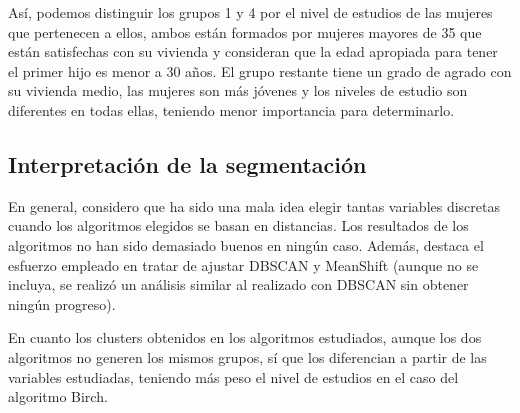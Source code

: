 \documentclass[a4paper, 20pt]{article}
\begin{document}
Así, podemos distinguir los grupos 1 y 4 por el nivel de estudios de las mujeres que pertenecen a ellos, ambos están formados por mujeres mayores de 35 que están satisfechas con su vivienda y consideran que la edad apropiada para tener el primer hijo es menor a 30 años. El grupo restante tiene un grado de agrado con su vivienda medio, las mujeres son más jóvenes y los niveles de estudio son diferentes en todas ellas, teniendo menor importancia para determinarlo.

\subsection{Interpretación de la segmentación}
En general, considero que ha sido una mala idea elegir tantas variables discretas cuando los algoritmos elegidos se basan en distancias. Los resultados de los algoritmos no han sido demasiado buenos en ningún caso. Además, destaca el esfuerzo empleado en tratar de ajustar DBSCAN y MeanShift (aunque no se incluya, se realizó un análisis similar al realizado con DBSCAN sin obtener ningún progreso).

En cuanto los clusters obtenidos en los algoritmos estudiados, aunque los dos algoritmos no generen los mismos grupos, sí que los diferencian a partir de las variables estudiadas, teniendo más peso el nivel de estudios en el caso del algoritmo Birch.
\newpage
\printbibliography

\end{document}
